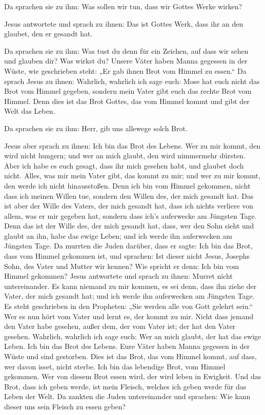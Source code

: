  Da sprachen sie zu ihm: Was sollen wir tun, dass wir
Gottes Werke wirken?

 Jesus antwortete und sprach zu ihnen: Das ist Gottes
Werk, dass ihr an den glaubet, den er gesandt hat.

 Da sprachen sie zu ihm: Was tust du denn für ein
Zeichen, auf dass wir sehen und glauben dir? Was wirkst du?
 Unsere Väter haben Manna gegessen in der Wüste, wie
geschrieben steht: „Er gab ihnen Brot vom Himmel zu essen.``
 Da sprach Jesus zu ihnen: Wahrlich, wahrlich ich sage
euch: Mose hat euch nicht das Brot vom Himmel gegeben, sondern mein
Vater gibt euch das rechte Brot vom Himmel.  Denn dies
ist das Brot Gottes, das vom Himmel kommt und gibt der Welt das Leben.

 Da sprachen sie zu ihm: Herr, gib uns allewege solch
Brot.

 Jesus aber sprach zu ihnen: Ich bin das Brot des Lebens.
Wer zu mir kommt, den wird nicht hungern; und wer an mich glaubt, den
wird nimmermehr dürsten.  Aber ich habe es euch gesagt,
dass ihr mich gesehen habt, und glaubet doch nicht. 
Alles, was mir mein Vater gibt, das kommt zu mir; und wer zu mir kommt,
den werde ich nicht hinausstoßen.  Denn ich bin vom
Himmel gekommen, nicht dass ich meinen Willen tue, sondern den Willen
des, der mich gesandt hat.  Das ist aber der Wille des
Vaters, der mich gesandt hat, dass ich nichts verliere von allem, was er
mir gegeben hat, sondern dass ich's auferwecke am Jüngsten Tage.
 Denn das ist der Wille des, der mich gesandt hat, dass,
wer den Sohn sieht und glaubt an ihn, habe das ewige Leben; und ich
werde ihn auferwecken am Jüngsten Tage.  Da murrten die
Juden darüber, dass er sagte: Ich bin das Brot, dass vom Himmel gekommen
ist,  und sprachen: Ist dieser nicht Jesus, Josephs Sohn,
des Vater und Mutter wir kennen? Wie spricht er denn: Ich bin vom Himmel
gekommen?  Jesus antwortete und sprach zu ihnen: Murret
nicht untereinander.  Es kann niemand zu mir kommen, es
sei denn, dass ihn ziehe der Vater, der mich gesandt hat; und ich werde
ihn auferwecken am Jüngsten Tage.  Es steht geschrieben
in den Propheten: „Sie werden alle von Gott gelehrt sein.`` Wer es nun
hört vom Vater und lernt es, der kommt zu mir.  Nicht
dass jemand den Vater habe gesehen, außer dem, der vom Vater ist; der
hat den Vater gesehen.  Wahrlich, wahrlich ich sage euch:
Wer an mich glaubt, der hat das ewige Leben.  Ich bin das
Brot des Lebens.  Eure Väter haben Manna gegessen in der
Wüste und sind gestorben.  Dies ist das Brot, das vom
Himmel kommt, auf dass, wer davon isset, nicht sterbe. 
Ich bin das lebendige Brot, vom Himmel gekommen. Wer von diesem Brot
essen wird, der wird leben in Ewigkeit. Und das Brot, dass ich geben
werde, ist mein Fleisch, welches ich geben werde für das Leben der Welt.
 Da zankten die Juden untereinander und sprachen: Wie
kann dieser uns sein Fleisch zu essen geben?

